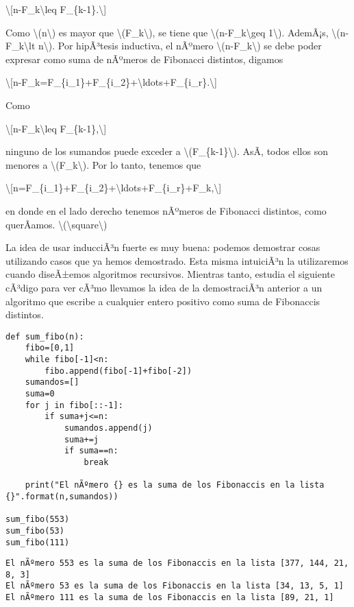 \textbackslash{[}n-F\_k\textbackslash leq F\_\{k-1\}.\textbackslash{]}

Como {\textbackslash(n\textbackslash)} es mayor que
{\textbackslash(F\_k\textbackslash)}, se tiene que
{\textbackslash(n-F\_k\textbackslash geq 1\textbackslash)}. AdemÃ¡s,
{\textbackslash(n-F\_k\textbackslash lt n\textbackslash)}. Por
hipÃ³tesis inductiva, el nÃºmero {\textbackslash(n-F\_k\textbackslash)}
se debe poder expresar como suma de nÃºmeros de Fibonacci distintos,
digamos

\textbackslash{[}n-F\_k=F\_\{i\_1\}+F\_\{i\_2\}+\textbackslash ldots+F\_\{i\_r\}.\textbackslash{]}

Como

\textbackslash{[}n-F\_k\textbackslash leq F\_\{k-1\},\textbackslash{]}

ninguno de los sumandos puede exceder a
{\textbackslash(F\_\{k-1\}\textbackslash)}. AsÃ­, todos ellos son menores
a {\textbackslash(F\_k\textbackslash)}. Por lo tanto, tenemos que

\textbackslash{[}n=F\_\{i\_1\}+F\_\{i\_2\}+\textbackslash ldots+F\_\{i\_r\}+F\_k,\textbackslash{]}

en donde en el lado derecho tenemos nÃºmeros de Fibonacci distintos,
como querÃ­amos. {{\textbackslash(\textbackslash square\textbackslash)}}

La idea de usar inducciÃ³n fuerte es muy buena: podemos demostrar cosas
utilizando casos que ya hemos demostrado. Esta misma intuiciÃ³n la
utilizaremos cuando diseÃ±emos algoritmos recursivos. Mientras tanto,
estudia el siguiente cÃ³digo para ver cÃ³mo llevamos la idea de la
demostraciÃ³n anterior a un algoritmo que escribe a cualquier entero
positivo como suma de Fibonaccis distintos.

\begin{verbatim}
def sum_fibo(n):
    fibo=[0,1]
    while fibo[-1]<n:
        fibo.append(fibo[-1]+fibo[-2])
    sumandos=[]
    suma=0
    for j in fibo[::-1]:
        if suma+j<=n:
            sumandos.append(j)
            suma+=j
            if suma==n:
                break

    print("El nÃºmero {} es la suma de los Fibonaccis en la lista {}".format(n,sumandos))

sum_fibo(553)
sum_fibo(53)
sum_fibo(111)
\end{verbatim}

\begin{verbatim}
El nÃºmero 553 es la suma de los Fibonaccis en la lista [377, 144, 21, 8, 3]
El nÃºmero 53 es la suma de los Fibonaccis en la lista [34, 13, 5, 1]
El nÃºmero 111 es la suma de los Fibonaccis en la lista [89, 21, 1]
\end{verbatim}

